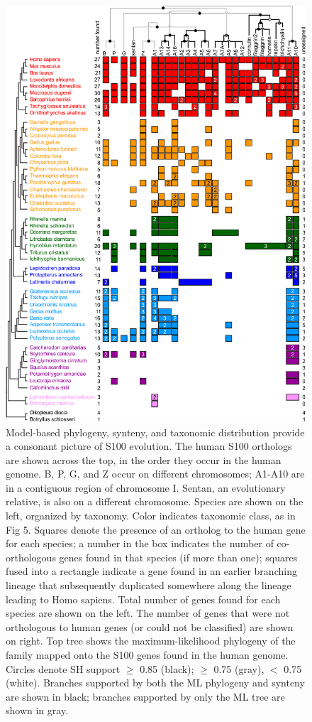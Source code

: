 \begin{figure}
\centering
	\includegraphics{ch3-fig3-smaller.png} 
\caption[Phylogeny, synteny, and taxonomic distribution provide a picture of S100 evolution]{Model-based phylogeny, synteny, and taxonomic distribution provide a consonant picture of S100 evolution. The human S100 orthologs are shown across the top, in the order they occur in the human genome. B, P, G, and Z occur on different chromosomes; A1-A10 are in a contiguous region of chromosome I. Sentan, an evolutionary relative, is also on a different chromosome. Species are shown on the left, organized by taxonomy. Color indicates taxonomic class, as in Fig 5. Squares denote the presence of an ortholog to the human gene for each species; a number in the box indicates the number of co-orthologous genes found in that species (if more than one); squares fused into a rectangle indicate a gene found in an earlier branching lineage that subsequently duplicated somewhere along the lineage leading to Homo sapiens. Total number of genes found for each species are shown on the left. The number of genes that were not orthologous to human genes (or could not be classified) are shown on right. Top tree shows the maximum-likelihood phylogeny of the family mapped onto the S100 genes found in the human genome. Circles denote SH support $\geq$ 0.85 (black); $\geq$ 0.75 (gray), $<$ 0.75 (white). Branches supported by both the ML phylogeny and synteny are shown in black; branches supported by only the ML tree are shown in gray.\label{samplefigure}}	
\end{figure}

